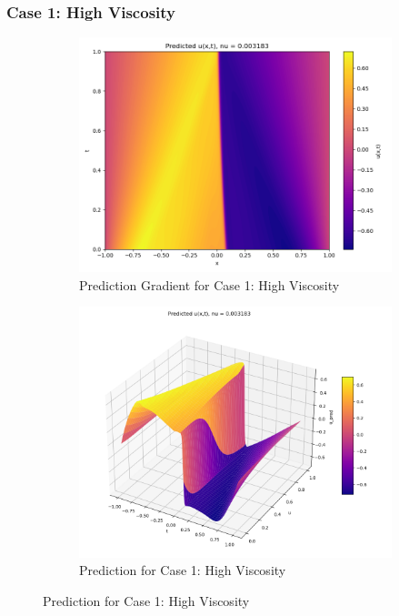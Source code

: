 \documentclass[11pt]{article}
\begin{document}
\subsubsection{Case 1: High Viscosity}
\begin{figure}[h!]
    \centering
    \begin{subfigure}[b]{0.48\textwidth}
        \includegraphics[width=\textwidth]{1D_PredGrad_NU1_Annealing.png}
        \caption{Prediction Gradient for Case 1: High Viscosity}
        \label{fig:PredGrad_NU1_LR}
    \end{subfigure}
    \hfill
    \begin{subfigure}[b]{0.48\textwidth}
        \includegraphics[width=\textwidth]{1D_Pred_NU1_Annealing.png}
        \caption{Prediction for Case 1: High Viscosity}
        \label{fig:Pred_NU1_LR}
    \end{subfigure}
    \caption{Prediction for Case 1: High Viscosity}
    \label{fig:PredTotal_NU1_LR}
\end{figure}
\end{document}
